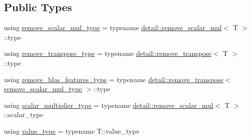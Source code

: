\subsection*{Public Types}
\begin{DoxyCompactItemize}
\item 
using \hyperlink{structBC_1_1tensors_1_1exprs_1_1blas__expression__traits_a98a1c4a12e066c8ae0109978c366282d}{remove\+\_\+scalar\+\_\+mul\+\_\+type} = typename \hyperlink{structBC_1_1tensors_1_1exprs_1_1detail_1_1remove__scalar__mul}{detail\+::remove\+\_\+scalar\+\_\+mul}$<$ T $>$\+::type
\item 
using \hyperlink{structBC_1_1tensors_1_1exprs_1_1blas__expression__traits_a527a7e3e800aef6cbaedd8eba5f9ae06}{remove\+\_\+transpose\+\_\+type} = typename \hyperlink{structBC_1_1tensors_1_1exprs_1_1detail_1_1remove__transpose}{detail\+::remove\+\_\+transpose}$<$ T $>$\+::type
\item 
using \hyperlink{structBC_1_1tensors_1_1exprs_1_1blas__expression__traits_aab36f77f1b5168d34fd214124ba46a65}{remove\+\_\+blas\+\_\+features\+\_\+type} = typename \hyperlink{structBC_1_1tensors_1_1exprs_1_1detail_1_1remove__transpose}{detail\+::remove\+\_\+transpose}$<$ \hyperlink{structBC_1_1tensors_1_1exprs_1_1blas__expression__traits_a98a1c4a12e066c8ae0109978c366282d}{remove\+\_\+scalar\+\_\+mul\+\_\+type} $>$\+::type
\item 
using \hyperlink{structBC_1_1tensors_1_1exprs_1_1blas__expression__traits_a786eb89c83fea25c296159067d6c1de2}{scalar\+\_\+multiplier\+\_\+type} = typename \hyperlink{structBC_1_1tensors_1_1exprs_1_1detail_1_1remove__scalar__mul}{detail\+::remove\+\_\+scalar\+\_\+mul}$<$ T $>$\+::scalar\+\_\+type
\item 
using \hyperlink{structBC_1_1tensors_1_1exprs_1_1blas__expression__traits_ab83e4462629a63d1058ea86bee5c174b}{value\+\_\+type} = typename T\+::value\+\_\+type
\end{DoxyCompactItemize}
